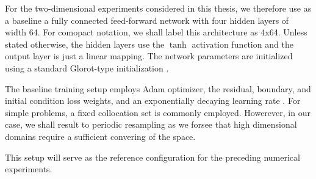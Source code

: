 
%


For the two-dimensional experiments considered in this thesis,
we therefore use as a baseline a fully connected feed-forward network with four hidden layers of width 64.
For comopact notation, we shall label this architecture as 4x64.
Unless stated otherwise, the hidden layers use the $\tanh$ activation function
and the output layer is just a linear mapping.
The network parameters are initialized using a standard Glorot-type initialization \cite{experts_guide}.

The baseline training setup employs Adam optimizer,
the residual, boundary, and initial condition loss weights,
and an exponentially decaying learning rate \cite{experts_guide,comprehensive_review_th}.
For simple problems, a fixed collocation set is commonly employed.
Howerever, in our case, we shall result to periodic resampling as we forsee that high dimensional domains
require a sufficient convering of the space.

This setup will serve as the reference configuration for the preceding numerical experiments.


%
%

